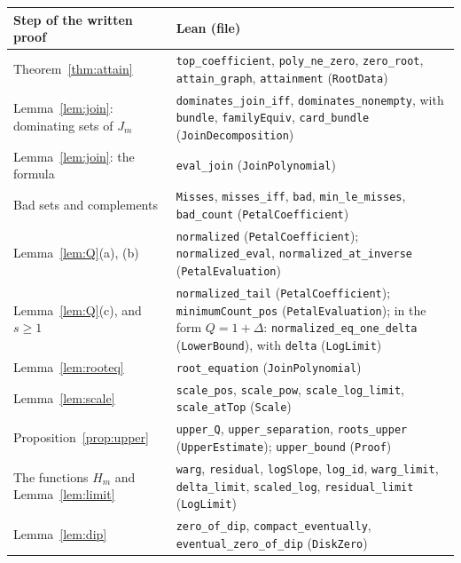 \documentclass[11pt]{article}
\theoremstyle{definition}
\theoremstyle{remark}
\begin{document}
{\begin{table}[ht]
\centering\footnotesize
\renewcommand{\arraystretch}{1.0}
\begin{tabular}{@{}>{\raggedright\arraybackslash}p{}>{\raggedright\arraybackslash}p{}@{}}
\hline
Step of the written proof & Lean (file) \\
\hline
Theorem~\ref{thm:attain} &
\texttt{top\_coefficient}, \texttt{poly\_ne\_zero}, \texttt{zero\_root},
\texttt{attain\_graph}, \texttt{attainment} (\texttt{RootData}) \\
Lemma~\ref{lem:join}: dominating sets of $J_m$ &
\texttt{dominates\_join\_iff}, \texttt{dominates\_nonempty}, with
\texttt{bundle}, \texttt{familyEquiv}, \texttt{card\_bundle}
(\texttt{JoinDecomposition}) \\
Lemma~\ref{lem:join}: the formula & \texttt{eval\_join}
(\texttt{JoinPolynomial}) \\
Bad sets and complements & \texttt{Misses}, \texttt{misses\_iff},
\texttt{bad}, \texttt{min\_le\_misses}, \texttt{bad\_count}
(\texttt{PetalCoefficient}) \\
Lemma~\ref{lem:Q}(a), (b) & \texttt{normalized} (\texttt{PetalCoefficient});
\texttt{normalized\_eval}, \texttt{normalized\_at\_inverse}
(\texttt{PetalEvaluation}) \\
Lemma~\ref{lem:Q}(c), and $s\ge1$ & \texttt{normalized\_tail}
(\texttt{PetalCoefficient}); \texttt{minimumCount\_pos}
(\texttt{PetalEvaluation}); in the form $Q=1+\Delta$:
\texttt{normalized\_eq\_one\_delta} (\texttt{LowerBound}), with
\texttt{delta} (\texttt{LogLimit}) \\
Lemma~\ref{lem:rooteq} & \texttt{root\_equation} (\texttt{JoinPolynomial}) \\
Lemma~\ref{lem:scale} & \texttt{scale\_pos}, \texttt{scale\_pow},
\texttt{scale\_log\_limit}, \texttt{scale\_atTop} (\texttt{Scale}) \\
Proposition~\ref{prop:upper} & \texttt{upper\_Q},
\texttt{upper\_separation}, \texttt{roots\_upper} (\texttt{UpperEstimate});
\texttt{upper\_bound} (\texttt{Proof}) \\
The functions $H_m$ and Lemma~\ref{lem:limit} & \texttt{warg},
\texttt{residual}, \texttt{logSlope}, \texttt{log\_id},
\texttt{warg\_limit}, \texttt{delta\_limit}, \texttt{scaled\_log},
\texttt{residual\_limit} (\texttt{LogLimit}) \\
Lemma~\ref{lem:dip} & \texttt{zero\_of\_dip}, \texttt{compact\_eventually},
\texttt{eventual\_zero\_of\_dip} (\texttt{DiskZero}) \\

\end{tabular}
\end{table}}
\end{document}
